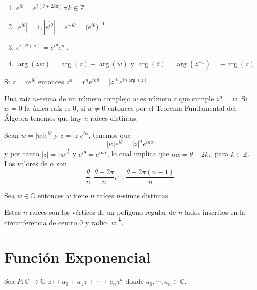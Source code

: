 \begin{prop}
  \begin{enumerate}[label=(\roman*)]
    \item $e^{i \theta} = e^{i(\theta + 2k\pi)} \forall k \in \mathbb{Z}$.
    \item $|e^{i \theta}| = 1, |\overline{e^{i \theta}}| = e^{-i\theta} = \big( e^{i \theta} \big)^{-1}$. 
    \item $e^{i( \theta + \sigma)} = e^{i \theta} e^{i \sigma}$.
    \item $\arg(zw) = \arg(z) + \arg(w)$ y $\arg(\overline{z}) = \arg(z^{-1}) = - \arg(z)$
  \end{enumerate}
\end{prop}

\begin{prop}
  Si $ z = r e^{i \theta}$ entonces $ z^{n} = r^{n}e^{i n \theta} = |z|^{n} e^{i n \arg(z)}$.
\end{prop}

\begin{obs}
  Una raíz $n$-esima de un número complejo $w$ es número $z$ que cumple $z^{n} = w$. Si $w = 0$ la única raíz es $0$, si $w \neq 0$ entonces por el Teorema Fundamental del Álgebra tenemos que hay $n$ raíces distintas.

  Sean $w= |w|e^{i \theta}$ y $z=|z|e^{i \alpha}$, tenemos que \[ |w|e^{i \theta} = |z|^{n}e^{i n \alpha} \] y por tanto $ |z| = |w|^{\frac{1}{n}} $ y $ e^{i \theta} = e^{i n \alpha}$, lo cual implica que $n\alpha = \theta + 2k\pi$ para $k \in \mathbb{Z}$. Los valores de $\alpha$ son \[ \frac{\theta}{n}, \frac{ \theta + 2\pi}{n}, \cdots, \frac{\theta + 2\pi(n-1)}{n} \] 
\end{obs}

\begin{prop}
  Sea $w \in \mathbb{C}$ entonces $w$ tiene $n$ raíces $n$-simas distintas.
\end{prop}

\begin{obs}
  Estas $n$ raíces son los vértices de un polígono regular de $n$ lados inscritos en la circunferencia de centro $0$ y radio $|w|^{\frac{1}{n}}$.
\end{obs}

\section{Función Exponencial}

\begin{defn}
  Sea $P: \mathbb{C} \to \mathbb{C}: z \mapsto a_{0} + a_{1}z + \cdots + a_{n}z^{n}$ donde $a_{0}, \cdots, a_{n} \in \mathbb{C}$. 
\end{defn}

